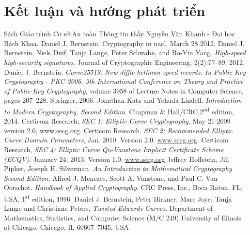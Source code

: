 \documentclass[a4paper,12pt]{report}
\begin{document}
\chapter*{Kết luận và hướng phát triển}
\printindex
\begin{thebibliography}{9}
 Sách Giáo trình Cơ sở An toàn Thông tin thầy Nguyễn Văn Khanh - Đại học Bách Khoa.
 Daniel J. Bernstein. Cryptography in nacl, March 28 2012.
 Daniel J. Bernstein, Niels Duif, Tanja Lange, Peter Schwabe, and Bo-Yin Yang. \textit{High-speed high-security signatures}. Journal of Cryptographic Engineering, 2(2):77–89, 2012.
 Daniel J. Bernstein. \textit{Curve25519: New diffie-hellman speed records. In Public Key Cryptography - PKC 2006, 9th International Conference on Theory and Practice of Public-Key Cryptography}, volume 3958 of Lecture Notes in Computer Science, pages 207–228. Springer, 2006.
 Jonathan Katz and Yehuda Lindell. \textit{Introduction to Modern Cryptography, Second Edition}. Chapman \& Hall/CRC,2\textsuperscript{nd} edition, 2014.
 Certicom Research, \textit{SEC 1: Elliptic Curve Cryptography}, May 21-2009 version 2.0, \url{www.secg.org}.
Certicom Research, \textit{SEC 2: Recommended Elliptic Curve Domain Parameters}, Jan. 2010. Version 2.0. \url{www.secg.org}.
 Certicom Research, \textit{SEC 4: Elliptic Curve Qu-Vanstone Implicit Certificate Scheme (ECQV)}. January 24, 2013. Version 1.0. \url{www.secg.org}
Jeffrey Hoffstein, Jill Pipher, Joseph H. Silverman, \textit{An Introduction to Mathematical Cryptography  Second Edition},  
 Alfred J. Menezes, Scott A. Vanstone, and Paul C. Van Oorschot. \textit{Handbook of Applied Cryptography}. CRC Press, Inc., Boca Raton, FL, USA, 1\textsuperscript{st} edition, 1996.
 Daniel J. Bernstein, Peter Birkner, Marc Joye, Tanja Lange and Christiane Peters, \textit{Twisted Edwards Curves}. Department of Mathematics, Statistics, and Computer Science (M/C 249) University of Illinois at Chicago, Chicago, IL 60607–7045, USA
\end{thebibliography}
\end{document}
